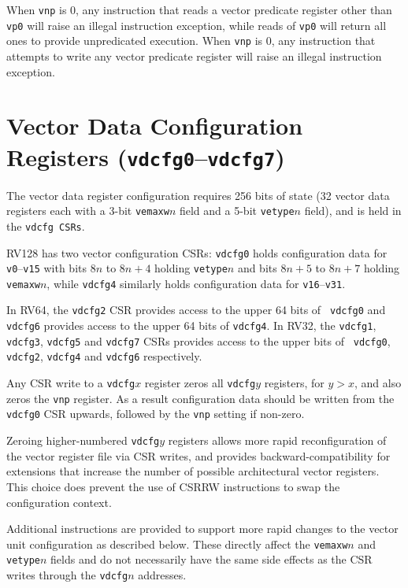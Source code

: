 When {\tt vnp} is 0, any instruction that reads a vector predicate
register other than {\tt vp0} will raise an illegal instruction
exception, while reads of {\tt vp0} will return all ones to provide
unpredicated execution.  When {\tt vnp} is 0, any instruction that
attempts to write any vector predicate register will raise an illegal
instruction exception.

\section{Vector Data Configuration Registers ({\tt vdcfg0}--{\tt vdcfg7})}

The vector data register configuration requires 256 bits of state (32
vector data registers each with a 3-bit {\tt vemaxw}$n$ field and a
5-bit {\tt vetype}$n$ field), and is held in the {\tt vdcfg CSRs}.

RV128 has two vector configuration CSRs: {\tt vdcfg0} holds
configuration data for {\tt v0}--{\tt v15} with bits $8n$ to $8n+4$
holding {\tt vetype}$n$ and bits $8n+5$ to $8n+7$ holding {\tt
  vemaxw}$n$, while {\tt vdcfg4} similarly holds configuration data
for {\tt v16}--{\tt v31}.

In RV64, the {\tt vdcfg2} CSR provides access to the upper 64 bits of {\tt
  vdcfg0} and {\tt vdcfg6} provides access to the upper 64 bits of
{\tt vdcfg4}.  In RV32, the {\tt vdcfg1}, {\tt vdcfg3}, {\tt vdcfg5}
and {\tt vdcfg7} CSRs provides access to the upper bits of {\tt
  vdcfg0}, {\tt vdcfg2}, {\tt vdcfg4} and {\tt vdcfg6} respectively.

Any CSR write to a {\tt vdcfg}$x$ register zeros all {\tt vdcfg}$y$
registers, for $y>x$, and also zeros the {\tt vnp} register.  As a
result configuration data should be written from the {\tt vdcfg0} CSR
upwards, followed by the {\tt vnp} setting if non-zero.

\begin{commentary}
  Zeroing higher-numbered {\tt vdcfg}$y$ registers allows more rapid
  reconfiguration of the vector register file via CSR writes, and
  provides backward-compatibility for extensions that increase the
  number of possible architectural vector registers.  This choice does
  prevent the use of CSRRW instructions to swap the configuration
  context.
\end{commentary}

\begin{commentary}
Additional instructions are provided to support more rapid changes to
the vector unit configuration as described below. These directly
affect the {\tt vemaxw}$n$ and {\tt vetype}$n$ fields and do not
necessarily have the same side effects as the CSR writes through the
{\tt vdcfg}$n$ addresses.
\end{commentary}



